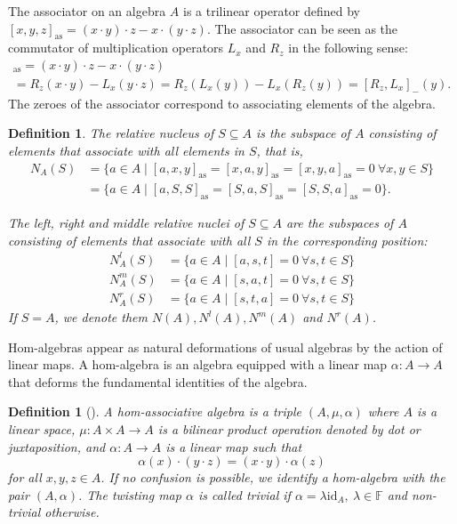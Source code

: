 \documentclass[12pt]{article}
\newtheorem{definition}[theorem]{Definition}
\begin{document}
        The associator on an algebra $A$ is a trilinear operator defined by $[x,y,z]_{\mathrm{as}}=(x\cdot y)\cdot z-x\cdot (y\cdot z)$.
		The associator can be seen as the commutator of multiplication operators $L_x$ and $R_z$ in the following sense:
		\begin{multline*}
			[x,y,z]_{\mathrm{as}}=(x\cdot y)\cdot z-x\cdot (y\cdot z)\\
			=R_z(x\cdot y)-L_x(y\cdot z)=R_z(L_x(y))-L_x(R_z(y))=[R_z,L_x]_{-}(y).
		\end{multline*}
		The zeroes of the associator correspond to associating elements of the algebra.
		\begin{definition}
			The \textit{relative nucleus} of $S\subseteq A$ is the subspace of  $A$ consisting of elements that associate with all elements in $S$, that is,
			\begin{align*}
				N_A(S) &=\{a\in A \mid [a,x,y]_{\mathrm{as}}=[x,a,y]_{\mathrm{as}}=[x,y,a]_{\mathrm{as}}=0\ \forall x,y\in S\} \\
				&= \{a\in A \mid [a,S,S]_{\mathrm{as}}= [S,a,S]_{\mathrm{as}}=[S,S,a]_{\mathrm{as}}=0\}.
			\end{align*}
			
			The left, right and middle relative nuclei of $S\subseteq A$ are the subspaces of $A$ consisting of elements that associate with all $S$ in the corresponding position:
			\begin{align*}
				N_A^l(S) &=\{a\in A \mid \left[a,s,t\right]=0\ \forall s,t\in S\} \\
				N_A^m(S) &=\{a\in A \mid \left[s,a,t\right]=0\ \forall s,t\in S\} \\
				N_A^r(S) &=\{a\in A \mid \left[s,t,a\right]=0\ \forall s,t\in S\}
			\end{align*}
			If $S=A$, we denote them $N(A), N^l(A), N^m(A)$ and $N^r(A)$.
		\end{definition}
		Hom-algebras appear as natural deformations of usual algebras by the action of linear maps. A hom-algebra is an algebra equipped with a linear map $\alpha\colon A\rightarrow A$ that deforms the fundamental identities of the algebra.
		
		
		\begin{definition}[\!\!{\cite[Definition 1.1]{ms:homstructure}}]
			A hom-associative algebra is a triple  $(A,\mu,\alpha)$ where $A$ is a linear space, $\mu\colon A\times A\rightarrow A$ is a bilinear product operation denoted by dot or juxtaposition, and $\alpha\colon A\rightarrow A$ is a linear map such that
			\[
			\alpha(x)\cdot(y\cdot z)=(x\cdot y)\cdot \alpha(z)
			\]
			for all $x,y,z\in A$. If no confusion is possible, we identify a hom-algebra with the pair $(A,\alpha)$. The twisting map $\alpha$ is called trivial if $\alpha=\lambda \mathrm{id}_A,\ \lambda\in\mathbb{F}$ and non-trivial otherwise.
		\end{definition}
		
\end{document}
